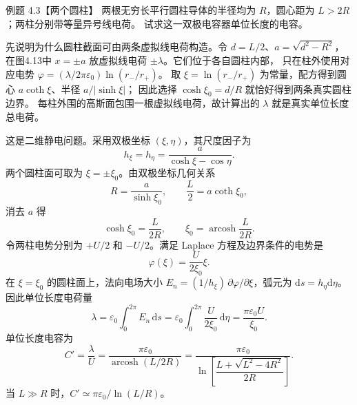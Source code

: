 \begin{origexamplebox}{例题 4.3【两个圆柱】}
两根无穷长平行圆柱导体的半径均为 $R$，圆心距为 $L>2R$；两柱分别带等量异号线电荷。
试求这一双极电容器单位长度的电容。
\begin{center}\end{center}
\label{fig:em-source-thirty-fifth-section-3}
\end{origexamplebox}

\twoCylindersFigure
{}

\begin{xesolution}
先说明为什么圆柱截面可由两条虚拟线电荷构造。令 $d=L/2$、$a=\sqrt{d^2-R^2}$，
在图4.13中 $x=\pm a$ 放虚拟线电荷 $\pm\lambda$。它们位于各自圆柱内部，
只在柱外使用对应电势 $\varphi=(\lambda/2\pi\varepsilon_0)\ln(r_-/r_+)$。
取 $\xi=\ln(r_-/r_+)$ 为常量，配方得到圆心 $a\coth\xi$、半径 $a/|\sinh\xi|$；
因此选择 $\cosh\xi_0=d/R$ 就恰好得到两条真实圆柱边界。
每柱外围的高斯面包围一根虚拟线电荷，故计算出的 $\lambda$ 就是真实单位长度总电荷。

这是二维静电问题。采用双极坐标 $(\xi,\eta)$，其尺度因子为
\[
 h_\xi=h_\eta=\frac a{\cosh\xi-\cos\eta}.
\]
两个圆柱面可取为 $\xi=\pm\xi_0$。由双极坐标几何关系
\[
 R=\frac a{\sinh\xi_0},\qquad
 \frac L2=a\coth\xi_0,
\]
消去 $a$ 得
\[
 \cosh\xi_0=\frac{L}{2R},\qquad
 \xi_0=\operatorname{arcosh}\frac{L}{2R}.
\]
令两柱电势分别为 $+U/2$ 和 $-U/2$。满足 Laplace 方程及边界条件的电势是
\[
 \varphi(\xi)=\frac{U}{2\xi_0}\xi.
\]
在 $\xi=\xi_0$ 的圆柱面上，法向电场大小
$E_n=(1/h_\xi)\,\partial\varphi/\partial\xi$，弧元为
$\mathrm ds=h_\eta\mathrm d\eta$。因此单位长度电荷量
\[
 \lambda=\varepsilon_0\int_0^{2\pi}E_n\,\mathrm ds
 =\varepsilon_0\int_0^{2\pi}\frac{U}{2\xi_0}\,\mathrm d\eta
 =\frac{\pi\varepsilon_0U}{\xi_0}.
\]
单位长度电容为
\[
 \boxed{C'=\frac\lambda U
 =\frac{\pi\varepsilon_0}{\operatorname{arcosh}(L/2R)}
 =\frac{\pi\varepsilon_0}
 {\ln\!\left[\dfrac{L+\sqrt{L^2-4R^2}}{2R}\right]}}.
\]
当 $L\gg R$ 时，$C'\simeq\pi\varepsilon_0/\ln(L/R)$。
\end{xesolution}

